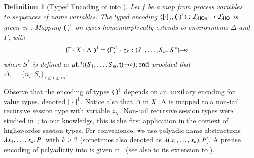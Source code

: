 \documentclass[preprint,11pt]{elsarticle}
\newtheorem{definition}{Definition}[section]
\begin{document}
{{%

\begin{definition}[Typed Encoding of \HOp into \HO]
\label{d:enc:hopitoho}
Let $f$ be a map from process variables to sequences of name variables.
%
The typed encoding 
$\enco{\map{\cdot}^{1}_f, \mapt{\cdot}^{1} %
}: \tyl{L}_{\HOp} \to \tyl{L}_{\HO}$ is given in 
. 
Mapping $(\!\!\langle\cdot\rangle\!\!)^{1}$ on types homomorphically extends to 
environments $\Delta$
and
$\Gamma$, with
$$
\tmap{\Gamma \cat \varp{X}:\Delta_1}{1}  =  \tmap{\Gamma}{1} \cat z_X:\shot{(S_1,\ldots,S_m,S^*)}
$$ 
where  
$S^*$ is defined as $\mu\mathsf{t}.? ((S_1,\ldots,S_m,\mathsf{t})\!\! \rightarrow\!\! \diamond) ; \mathtt{end}$
provided that $\Delta_1 = \{n_i:S_i\}_{1\leq i\leq m}$.
\end{definition}



Observe that the encoding of types $(\!\!\langle\cdot\rangle\!\!)^{1}$ depends on an auxiliary encoding 
for value types, denoted ${\big\lfloor \cdot\big\rfloor^{1}}$.
Notice also that $\Delta$ in $X:\Delta$ is mapped to a non-tail
recursive session type with variable $z_X$. %
Non-tail
recursive session types {were} studied in~\cite{DBLP:journals/corr/abs-1202-2086,TGC14};
{to our knowledge,}
this is the first application in the
context of higher-order session types.
For convenience,  %
we use polyadic name abstractions $\lambda x_1, \ldots, x_k.\,P$, with $k \geq 2$ (sometimes also denoted as $\lambda (x_1, \ldots, x_k).\,P$).
A precise encoding of polyadicity into \HOp is given in~ (see also  to its extension to \HO).

}}
\end{document}
